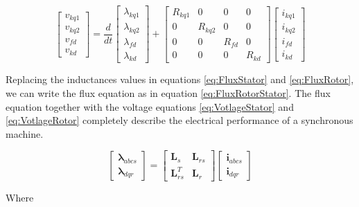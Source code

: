 \begin{equation} \label{eq:VotlageRotor}
	\begin{bmatrix}
		v_{kq1} \\
		v_{kq2} \\
		v_{fd} \\
		v_{kd}
	\end{bmatrix}
	=
	\frac{d}{dt}
	\begin{bmatrix}
		\lambda_{kq1} \\
		\lambda_{kq2} \\
		\lambda_{fd} \\
		\lambda_{kd}
	\end{bmatrix}
	+
	\begin{bmatrix}
		R_{kq1} & 0 & 0 & 0 \\
		0 & R_{kq2} & 0 & 0 \\
		0 & 0 & R_{fd} & 0 \\
		0 & 0 & 0 & R_{kd}
	\end{bmatrix}
	\begin{bmatrix}
		i_{kq1} \\
		i_{kq2} \\
		i_{fd} \\
		i_{kd}
	\end{bmatrix}
\end{equation}

Replacing the inductances values in equations \ref{eq:FluxStator} and \ref{eq:FluxRotor}, we can write the flux equation as in equation \ref{eq:FluxRotorStator}. The flux equation together with the voltage equations \ref{eq:VotlageStator} and \ref{eq:VotlageRotor} completely describe the electrical performance of a synchronous machine.

\begin{equation} \label{eq:FluxRotorStator}
	\begin{bmatrix}
		\boldsymbol{\lambda}_{abcs} \\
		\boldsymbol{\lambda}_{dqr}
	\end{bmatrix}
	=
	\begin{bmatrix}
		\mathbf{L}_s & \mathbf{L}_{rs} \\
		\mathbf{L}_{rs}^{T} & \mathbf{L}_r
	\end{bmatrix}
	\begin{bmatrix}
		\mathbf{i}_{abcs} \\
		\mathbf{i}_{dqr}
	\end{bmatrix}
\end{equation}

Where

